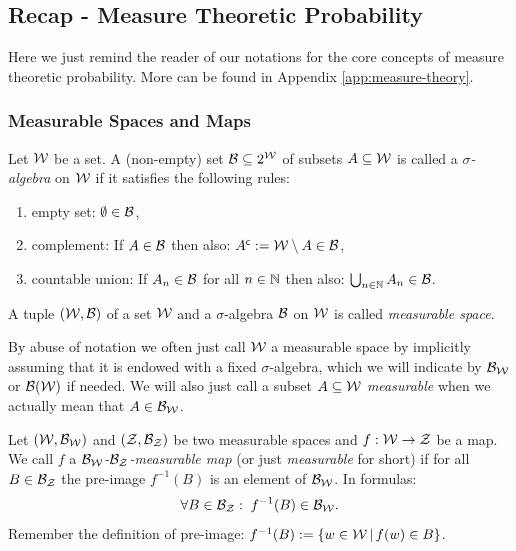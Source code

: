 \subsection{Recap - Measure Theoretic Probability}

Here we just remind the reader of our notations for the core concepts of measure theoretic probability. More can be found 
in Appendix \ref{app:measure-theory}.

\subsubsection{Measurable Spaces and Maps}

\begin{Def}
    \label{def:sigma-algebra}
    Let $\mathcal{W}$ be a set. A (non-empty) set $\mathcal{B} \subseteq 2^{\mathcal{W}}$ of subsets $A \subseteq \mathcal{W}$ is called a 
    \emph{$\sigma$-algebra} on $\mathcal{W}$ if it satisfies the following rules:
    \begin{enumerate}[label=\roman*)]
        \item empty set: $\emptyset \in \mathcal{B}$,
        \item complement: If $A \in \mathcal{B}$ then also: $A^{\mathsf{c}}:= \mathcal{W}\setminus A \in \mathcal{B}$,
        \item countable union: If $A_n \in \mathcal{B}$ for all $n \in \mathbb{N}$ then also: $\bigcup_{n \in \mathbb{N}} A_n \in \mathcal{B}$.
    \end{enumerate}
\end{Def}

\begin{Def}
    \label{def:measurable-space}
    A tuple $(\mathcal{W},\mathcal{B})$ of a set $\mathcal{W}$ and a $\sigma$-algebra $\mathcal{B}$ on $\mathcal{W}$ is called \emph{measurable space}.
\end{Def}

\begin{Rem}
 By abuse of notation we often just call $\mathcal{W}$ a measurable space by implicitly assuming that it is endowed with a fixed $\sigma$-algebra, which we will indicate by $\mathcal{B}_{\mathcal{W}}$ or $\mathcal{B}(\mathcal{W})$ if needed. We will also just call a subset $A \subseteq \mathcal{W}$ \emph{measurable} when we actually mean that $A \in \mathcal{B}_{\mathcal{W}}$.
\end{Rem}

\begin{Def}
    \label{def-measurable-map}
    Let $(\mathcal{W},\mathcal{B}_{\mathcal{W}})$ and $(\mathcal{Z},\mathcal{B}_{\mathcal{Z}})$ be two measurable spaces and $f: \mathcal{W} \to \mathcal{Z}$ be a map.
    We call $f$ a \emph{$\mathcal{B}_{\mathcal{W}}$-$\mathcal{B}_{\mathcal{Z}}$-measurable map} (or just \emph{measurable} for short) if
    for all $B \in \mathcal{B}_{\mathcal{Z}}$ the pre-image $f^{-1}(B)$ is an element of $\mathcal{B}_{\mathcal{W}}$. In formulas:
    \[\forall B \in \mathcal{B}_{\mathcal{Z}}:\; f^{-1}(B) \in \mathcal{B}_{\mathcal{W}}.\]
    Remember the definition of pre-image: $f^{-1}(B) := \{ w\in \mathcal{W}\,|\, f(w) \in B \}$.
\end{Def}

